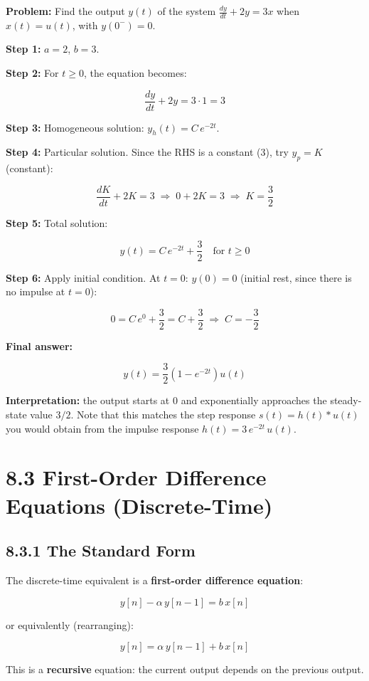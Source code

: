 \documentclass[11pt]{article}
\begin{document}
\textbf{Problem:} Find the output $y(t)$ of the system $\tfrac{dy}{dt} + 2y = 3x$ when $x(t) = u(t)$, with $y(0^-) = 0$.

\textbf{Step 1:} $a = 2$, $b = 3$.

\textbf{Step 2:} For $t \geq 0$, the equation becomes:

\[\frac{dy}{dt} + 2y = 3\cdot 1 = 3\]

\textbf{Step 3:} Homogeneous solution: $y_h(t) = C\,e^{-2t}$.

\textbf{Step 4:} Particular solution. Since the RHS is a constant (3), try $y_p = K$ (constant):

\[\frac{d K}{dt} + 2K = 3\;\Rightarrow\;0 + 2K = 3\;\Rightarrow\;K = \frac{3}{2}\]

\textbf{Step 5:} Total solution:

\[y(t) = C\,e^{-2t} + \frac{3}{2}\quad\text{for } t \geq 0\]

\textbf{Step 6:} Apply initial condition. At $t=0$: $y(0) = 0$ (initial rest, since there is no impulse at $t=0$):

\[0 = C\,e^{0} + \frac{3}{2} = C + \frac{3}{2}\;\Rightarrow\;C = -\frac{3}{2}\]

\textbf{Final answer:}

\[\boxed{\;y(t) = \frac{3}{2}\left(1 - e^{-2t}\right)u(t)\;}\]

\textbf{Interpretation:} the output starts at 0 and exponentially approaches the steady-state value $3/2$. Note that this matches the step response $s(t) = h(t)*u(t)$ you would obtain from the impulse response $h(t) = 3\,e^{-2t}\,u(t)$.

\section*{8.3 First-Order Difference Equations (Discrete-Time)}

\subsection*{8.3.1 The Standard Form}

The discrete-time equivalent is a \textbf{first-order difference equation}:

\[\boxed{\;y[n] - \alpha\,y[n-1] = b\,x[n]\;}\]

or equivalently (rearranging):

\[y[n] = \alpha\,y[n-1] + b\,x[n]\]

This is a \textbf{recursive} equation: the current output depends on the previous output.
\end{document}
